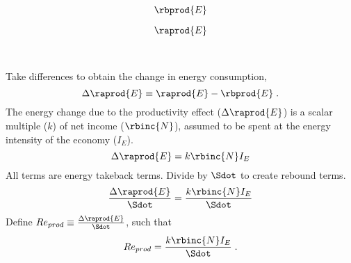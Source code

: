

\begin{landscape}

\linespread{1}

\derivheader{\bf{\ProdEffect}}

\sectionsep{}

{
\begin{equation}
  \rbprod{E}
\end{equation}
}
{
}

\sectionsep{}

{
\begin{equation}
\raprod{E}
\end{equation}
}
{
}

\sectionsep{}

\derivsection{}
{
~

Take differences to obtain the change in energy consumption,
%
\begin{equation}
  \Delta \raprod{E} \equiv \raprod{E} - \rbprod{E} \; .
\end{equation}
%
The energy change due to the productivity effect ($\Delta \raprod{E}$) 
is a scalar multiple ($k$) of net income ($\rbinc{N}$), 
assumed to be spent at the energy intensity of the economy ($I_E$).
%
\begin{equation}
  \Delta \raprod{E} = k \rbinc{N} I_E
\end{equation}
%
All terms are energy takeback terms.
Divide by $\Sdot$
to create rebound terms.
%
\begin{equation}
  \frac{\Delta \raprod{E}}{\Sdot} = \frac{k \rbinc{N} I_E}{\Sdot}
\end{equation}
%
Define 
$Re_{prod} \equiv \frac{\Delta \raprod{E}}{\Sdot}$, 
such that
%
\begin{equation}
  Re_{prod} = \frac{k \rbinc{N} I_E}{\Sdot} \; .
\end{equation}
%
}
{
~

}
\end{landscape}

